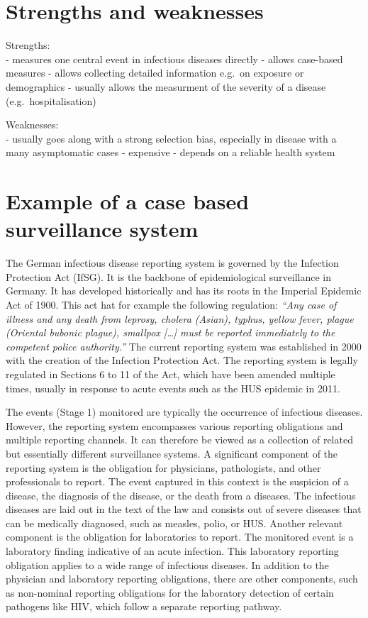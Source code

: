 \documentclass[
  letterpaper,
  DIV=11,
  numbers=noendperiod]{scrreprt}
\begin{document}
\section{Strengths and weaknesses}\label{strengths-and-weaknesses}

Strengths:\\
- measures one central event in infectious diseases directly - allows
case-based measures - allows collecting detailed information e.g.~on
exposure or demographics - usually allows the measurment of the severity
of a disease (e.g.~hospitalisation)

Weaknesses:\\
- usually goes along with a strong selection bias, especially in disease
with a many asymptomatic cases - expensive - depends on a reliable
health system

\section{Example of a case based surveillance
system}\label{example-of-a-case-based-surveillance-system}

The German infectious disease reporting system is governed by the
Infection Protection Act (IfSG). It is the backbone of epidemiological
surveillance in Germany. It has developed historically and has its roots
in the Imperial Epidemic Act of 1900. This act hat for example the
following regulation: \emph{``Any case of illness and any death from
leprosy, cholera (Asian), typhus, yellow fever, plague (Oriental bubonic
plague), smallpox {[}\ldots{]} must be reported immediately to the
competent police authority.''} The current reporting system was
established in 2000 with the creation of the Infection Protection Act.
The reporting system is legally regulated in Sections 6 to 11 of the
Act, which have been amended multiple times, usually in response to
acute events such as the HUS epidemic in 2011.

The events (Stage 1) monitored are typically the occurrence of
infectious diseases. However, the reporting system encompasses various
reporting obligations and multiple reporting channels. It can therefore
be viewed as a collection of related but essentially different
surveillance systems. A significant component of the reporting system is
the obligation for physicians, pathologists, and other professionals to
report. The event captured in this context is the suspicion of a
disease, the diagnosis of the disease, or the death from a diseases. The
infectious diseases are laid out in the text of the law and consists out
of severe diseases that can be medically diagnosed, such as measles,
polio, or HUS. Another relevant component is the obligation for
laboratories to report. The monitored event is a laboratory finding
indicative of an acute infection. This laboratory reporting obligation
applies to a wide range of infectious diseases. In addition to the
physician and laboratory reporting obligations, there are other
components, such as non-nominal reporting obligations for the laboratory
detection of certain pathogens like HIV, which follow a separate
reporting pathway.
\end{document}
